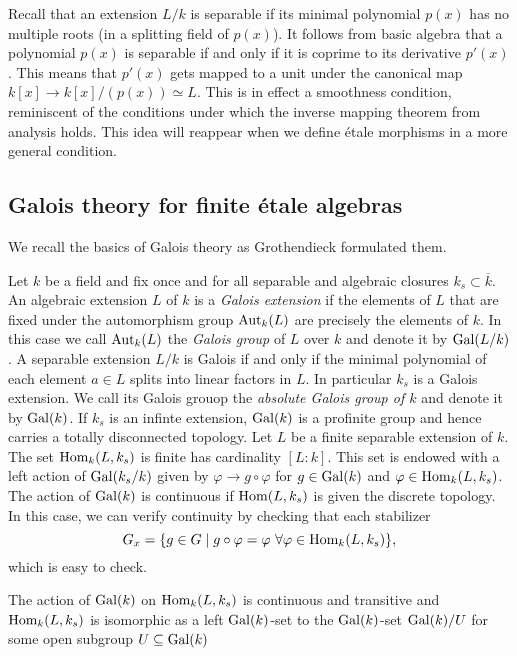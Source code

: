 Recall that an extension $L/k$ is separable if its minimal polynomial $p(x)$ has no multiple roots (in a splitting field of $p(x)$). It follows from basic algebra that a polynomial $p(x)$ is separable if and only if it is coprime to its derivative $p'(x)$. This means that $p'(x)$ gets mapped to a unit under the canonical map $k[x] \to k[x]/(p(x)) \simeq L$. This is in effect a smoothness condition, reminiscent of the conditions under which the inverse mapping theorem from analysis holds. This idea will reappear when we define \'etale morphisms in a more general condition.

\subsection{Galois theory for finite \'etale algebras}
We recall the basics of Galois theory as Grothendieck formulated them.

\begin{construction}
  Let $k$ be a field and fix once and for all separable and algebraic closures $k_s \subset \overline{k}$.  An algebraic extension $L$ of $k$ is a \textit{Galois extension} if the elements of $L$ that are fixed under the automorphism group $\operatorname{Aut}_k(L)$ are precisely the elements of $k$. In this case we call $\operatorname{Aut}_k(L)$ the \textit{Galois group} of $L$ over $k$ and denote it by $\operatorname{Gal}(L/k)$. A separable extension $L/k$ is Galois if and only if the minimal polynomial of each element $a \in L$ splits into linear factors in $L$. In particular $k_s$ is a Galois extension. We call its Galois grouop the \textit{absolute Galois group of $k$} and denote it by $\operatorname{Gal}(k)$. If $k_s$ is an infinte extension, $\operatorname{Gal}(k)$ is a profinite group and hence carries a totally disconnected topology. Let $L$ be a finite separable extension of $k$. The set $\operatorname{Hom}_k(L, k_s)$ is finite has cardinality $[L:k]$. This set is endowed with a left action of $\operatorname{Gal}(k_s/k)$ given by $\varphi \to g \circ \varphi$ for $g \in \operatorname{Gal}(k)$ and $\varphi \in \operatorname{Hom}_k(L, k_s)$. The action of $\operatorname{Gal}(k)$ is continuous if $\operatorname{Hom}(L, k_s)$ is given the discrete topology. In this case, we can verify continuity by checking that each stabilizer 
  \[G_x = \{ g \in G \mid g \circ \varphi =  \varphi\ \forall\varphi \in \operatorname{Hom}_k(L, k_s)\}, \]
  which is easy to check.
\end{construction}

\begin{proposition}
  The action of $\operatorname{Gal}(k)$ on $\operatorname{Hom}_k(L, k_s)$ is continuous and transitive and $\operatorname{Hom}_k(L, k_s)$ is isomorphic as a left $\operatorname{Gal}(k)$-set to the $\operatorname{Gal}(k)$-set $\operatorname{Gal}(k)/U$ for some open subgroup $U \subseteq \operatorname{Gal}(k)$
\end{proposition}

